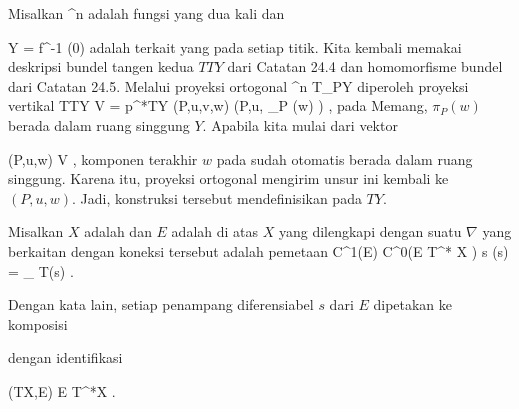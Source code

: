 {}
{

Misalkan
 {\R^n } { \R
} {}
adalah fungsi yang dua kali
dan

\mavergleichskette
{\vergleichskette
{ Y
}
{ = }{ f^{-1} (0)
}
{  }{
}
{    }{
}
{   }{
}
}
{}{}{}
adalah
terkait yang
pada setiap titik. Kita kembali memakai deskripsi bundel tangen kedua $TTY$ dari
Catatan 24.4
dan homomorfisme bundel dari
Catatan 24.5.
Melalui proyeksi ortogonal
\maabb {} {\R^n } { T_PY
} {}
diperoleh proyeksi vertikal
\maabbeledisp {} {TTY} { V = p^*TY
} {(P,u,v,w)} { (P,u, \pi_P (w) )
} {,}
pada
Memang, $\pi_P(w)$ berada dalam ruang singgung $Y$. Apabila kita mulai dari vektor

\mavergleichskette
{\vergleichskette
{ (P,u,w)
}
{ \in }{ V
}
{  }{
}
{    }{
}
{   }{
}
}
{}{}{,}
komponen terakhir $w$ pada
 sudah otomatis berada dalam ruang singgung. Karena itu, proyeksi ortogonal mengirim unsur ini kembali ke $(P,u,w)$. Jadi, konstruksi tersebut mendefinisikan
pada $TY$.

}


{}
{

Misalkan $X$ adalah
dan $E$ adalah
di atas $X$ yang dilengkapi dengan suatu
$\nabla$ yang berkaitan dengan koneksi tersebut adalah pemetaan
\maabbeledisp {\nabla} {C^1(E)} { C^0(E \otimes T^* X )
} { s } { \nabla(s) = \pi_{ }  \circ T(s)
} {.}

}
Dengan kata lain, setiap penampang diferensiabel $s$ dari $E$
 {} {}
dipetakan ke komposisi

 {  }

dengan identifikasi

\mavergleichskette
{\vergleichskette
{ (TX,E)
}
{ \cong }{ E \otimes T^*X
}
{  }{
}
{    }{
}
{   }{
}
}
{}{}{.}

